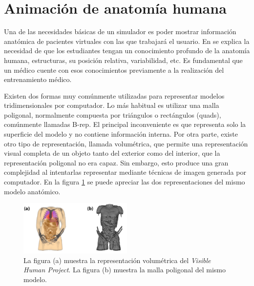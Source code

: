 \section{Animación de anatomía humana} 
\label{art:anatomy}



Una de las necesidades básicas de un simulador es poder mostrar información anatómica de pacientes virtuales con las que trabajará el usuario. En  \cite{preim2018survey} se explica la necesidad de que los estudiantes tengan un conocimiento profundo de la anatomía humana, estructuras, su posición relativa, variabilidad, etc. Es fundamental que un médico cuente con esos conocimientos previamente a la realización del entrenamiento médico.

Existen dos formas muy comúnmente utilizadas para representar modelos tridimensionales por computador. Lo más habitual es utilizar una malla poligonal, normalmente compuesta por triángulos o rectángulos (quads), comúnmente llamadas \ac{B-rep}. El principal inconveniente es que representa solo la superficie del modelo y no contiene información interna.  %
Por otra parte, existe otro tipo de representación, llamada volumétrica, que permite una representación visual completa de un objeto tanto del exterior como del interior, que la representación poligonal no era capaz. Sin embargo, esto produce una gran complejidad al intentarlas representar mediante técnicas de imagen generada por computador.
En la figura \ref{fig:HVP} se puede apreciar las dos representaciones del mismo modelo anatómico.

\begin{figure}[h]
   \centering
    \includegraphics[width=0.5\textwidth]{IMG/volvsb-rep.png}
    \caption{La figura (a) muestra la representación volumétrica del \emph{Visible Human Project}\cite{ackerman1998visible}. La figura (b) muestra la malla poligonal del mismo modelo. }
   \label{fig:HVP}
\end{figure}



